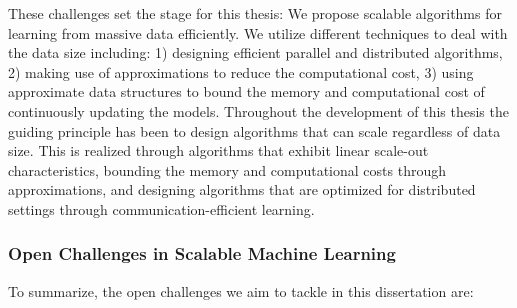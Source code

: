 These challenges set the stage for this thesis: We propose scalable algorithms
for learning from massive data efficiently. We utilize different techniques
to deal with the data size including: 1) designing efficient parallel and distributed
algorithms, 2) making use of approximations to reduce the computational
cost, 3) using approximate data structures to bound the memory and computational cost
of continuously updating the models. Throughout the development of this thesis the guiding
principle has been to design algorithms that can scale regardless of data size.
This is realized through algorithms that exhibit linear scale-out characteristics,
bounding the memory and computational costs through approximations, and designing
algorithms that are optimized for distributed settings through communication-efficient
learning.


\subsubsection*{Open Challenges in Scalable Machine Learning}

To summarize, the open challenges
we aim to tackle in this dissertation are:

